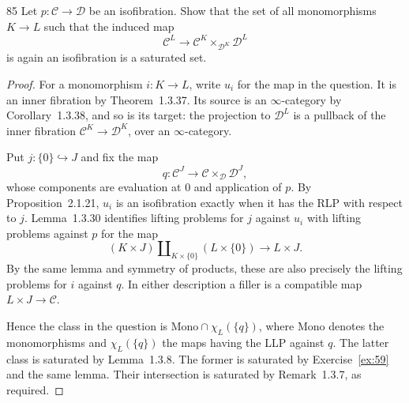 \begin{exercise}{85}
Let $p\colon\mathcal C\to\mathcal D$ be an isofibration. Show that the set of all
monomorphisms $K\to L$ such that the induced map
\[
 \mathcal C^L\to\mathcal C^K\times_{\mathcal D^K}\mathcal D^L
\]
is again an isofibration is a saturated set.

\begin{proof}
For a monomorphism $i\colon K\to L$, write $u_i$ for the
map in the question.
It is an inner fibration by Theorem~1.3.37.
Its source is an $\infty$-category by Corollary~1.3.38,
and so is its target: the projection to $\mathcal D^L$
is a pullback of the inner fibration
$\mathcal C^K\to\mathcal D^K$, over an $\infty$-category.

Put $j\colon\{0\}\hookrightarrow J$ and fix the map
\[
 q\colon\mathcal C^J\longrightarrow
 \mathcal C\times_{\mathcal D}\mathcal D^J,
\]
whose components are evaluation at $0$ and application of $p$.
By Proposition~2.1.21, $u_i$ is an isofibration exactly
when it has the RLP with respect to $j$.
Lemma~1.3.30 identifies lifting problems for $j$ against
$u_i$ with lifting problems against $p$ for the map
\[
 (K\times J)\amalg_{K\times\{0\}}(L\times\{0\})
 \longrightarrow L\times J.
\]
By the same lemma and symmetry of products, these are
also precisely the lifting problems for $i$ against $q$.
In either description a filler is a compatible map
$L\times J\to\mathcal C$.

Hence the class in the question is
$\mathrm{Mono}\cap\chi_L(\{q\})$,
where $\mathrm{Mono}$ denotes the monomorphisms and
$\chi_L(\{q\})$ the maps having the LLP against $q$.
The latter class is saturated by Lemma~1.3.8.
The former is saturated by Exercise~\ref{ex:59} and
the same lemma.
Their intersection is saturated by Remark~1.3.7,
as required.
\end{proof}
\end{exercise}
